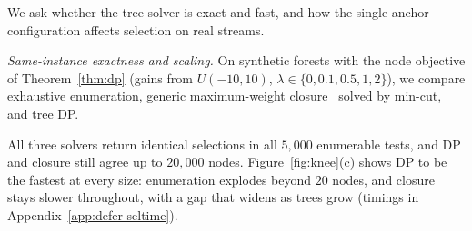 \label{sec:exp:selector}
We ask whether the tree solver is exact and fast, and how the single-anchor
configuration affects selection on real streams.

\emph{Same-instance exactness and scaling.}
On synthetic forests with the node objective of Theorem~\ref{thm:dp} (gains from
$U(-10,10)$, $\lambda\in\{0,0.1,0.5,1,2\}$), we compare exhaustive enumeration,
generic maximum-weight closure~\cite{picard1976maximal} solved by min-cut, and
tree DP.

All three solvers return identical selections in all $5{,}000$ enumerable
tests, and DP and closure still agree up to $20{,}000$ nodes.
Figure~\ref{fig:knee}(c) shows DP to be the fastest at every size:
enumeration explodes beyond $20$ nodes, and closure stays slower throughout,
with a gap that widens as trees grow (timings in
Appendix~\ref{app:defer-seltime}).
